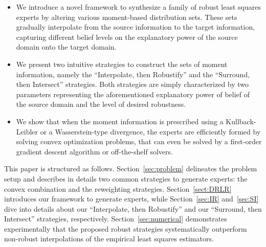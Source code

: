 \documentclass{article}
\begin{document}
    \begin{itemize}[leftmargin = 2.5mm, itemsep=0.5mm]
\vspace{-.3cm}
        \item We introduce a novel framework to synthesize a family of robust least squares experts by altering various moment-based distribution sets. These sets gradually interpolate from the source information to the target information, capturing different belief levels on the explanatory power of the source domain onto the target domain. 
        
        \item We present two intuitive strategies to construct the sets of moment information, namely the ``Interpolate, then Robustify'' and the ``Surround, then Intersect'' strategies. Both strategies are simply characterized by two parameters representing the aforementioned explanatory power of belief of the source domain and the level of desired robustness.
        
        \item We show that when the moment information
        is prescribed using a Kullback-Leibler or a Wasserstein-type divergence, the experts are efficiently formed by solving convex optimization problems, that can even be solved by a first-order gradient descent algorithm or off-the-shelf solvers.
    \end{itemize}
    \vspace{-.3cm}
    
    
    This paper is structured as follows. Section~\ref{sec:problem} delineates the problem setup and describes in details two common strategies to generate experts: the convex combination and the reweighting strategies. Section~\ref{sect:DRLR} introduces our framework to generate experts, while Section~\ref{sec:IR} and~\ref{sec:SI} dive into details about our ``Interpolate, then Robustify'' and our ``Surround, then Intersect'' strategies, respectively. Section~\ref{sec:numerical} demonstrates experimentally that the proposed robust strategies systematically outperform non-robust interpolations of the empirical least squares estimators.
    
\end{document}
